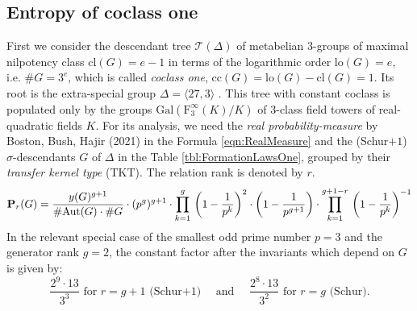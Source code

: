 \documentclass{amsart}
\theoremstyle{definition}
\theoremstyle{remark}
\begin{document}
\subsection{Entropy of coclass one}
\label{ss:CoClassOne}
First we consider the descendant tree
\(\mathcal{T}(\Delta)\)
of metabelian \(3\)-groups of maximal nilpotency class
\(\mathrm{cl}(G)=e-1\)
in terms of the logarithmic order
\(\mathrm{lo}(G)=e\), i.e. \(\#G=3^e\),
which is called \textit{coclass one},
\(\mathrm{cc}(G)=\mathrm{lo}(G)-\mathrm{cl}(G)=1\).
Its root is the extra-special group \(\Delta=\langle 27,3\rangle\)
\cite{BEO2005}.
This tree with constant coclass is populated only by the groups
\(\mathrm{Gal}(\mathrm{F}_3^\infty(K)/K)\)
of \(3\)-class field towers
of real-quadratic fields \(K\).
For its analysis, we need the \textit{real probability-measure}
by Boston, Bush, Hajir (2021)
\cite{BBH2021}
in the Formula
\eqref{eqn:RealMeasure}
and the (Schur\(+1\)) \(\sigma\)-descendants \(G\) of \(\Delta\) in the Table
\ref{tbl:FormationLawsOne},
grouped by their \textit{transfer kernel type} (TKT).
The relation rank is denoted by \(r\).
\begin{equation}
\label{eqn:RealMeasure}
{\bf P}_r(G)=\frac{y(G)^{g+1}}{\#\mathrm{Aut}(G)\cdot\#G}\cdot(p^g)^{g+1}\cdot\prod_{k=1}^{g}\,\left(1-\frac{1}{p^k}\right)^2
\cdot\left(1-\frac{1}{p^{g+1}}\right)\cdot\prod_{k=1}^{g+1-r}\,\left(1-\frac{1}{p^k}\right)^{-1}
\end{equation}
In the relevant special case of
the smallest odd prime number \(p=3\)
and the generator rank \(g=2\),
the constant factor after the invariants which depend on \(G\) is given by:
\begin{equation}
\label{eqn:RealFactor}
\frac{2^9\cdot 13}{3^3} \text{ for } r=g+1 \text{ (Schur+1)}
\quad \text{ and } \quad 
\frac{2^8\cdot 13}{3^2} \text{ for } r=g \text{ (Schur)}.
\end{equation}

\end{document}
